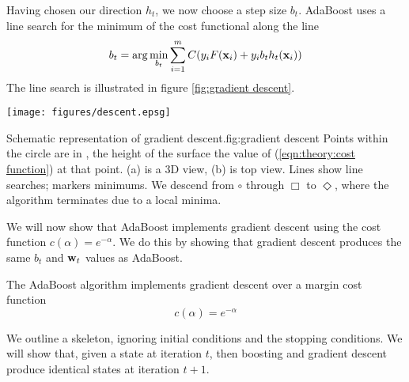 Having chosen our direction $h_t$, we now choose a step size $b_t$.
AdaBoost uses a line search for the minimum of the cost functional
along the line
%
\begin{equation}
b_t = \arg \min_{b_t} \sum_{i=1}^{m} C(y_i F(\mathbf{x}_i) + y_i b_t h_t(\mathbf{x}_i))
\end{equation}
%
The line search is illustrated in figure \ref{fig:gradient descent}.

\begin{linefigure}
\begin{center}
\texttt{[image: figures/descent.epsg]}
\end{center}
\begin{capt}{Schematic representation of gradient
descent.}{fig:gradient descent}
Points within the circle are in \calH, the height of the surface
the value of (\ref{eqn:theory:cost function}) at that point.  (a) is a
3D view, (b) is top view. Lines show line searches; markers
minimums.  We descend from $\circ$ through $\Box$ to $\Diamond$, where
the algorithm terminates due to a local minima.
\end{capt}
\end{linefigure}

We will now show that AdaBoost implements gradient descent using the
cost function $c(\alpha) = e^{-\alpha}$.  We do this by showing that
gradient descent produces the same $b_t$ and $\mathbf{w}_t$ values as AdaBoost.

\begin{theorem}
The AdaBoost algorithm implements gradient descent over a margin cost
function
%
\begin{equation}
c(\alpha) = e^{-\alpha}
\end{equation}
\end{theorem}

\proof We outline a skeleton, ignoring initial conditions and the
stopping conditions.  We will show that, given a state at iteration
$t$, then boosting and gradient descent produce identical states at
iteration $t+1$.

